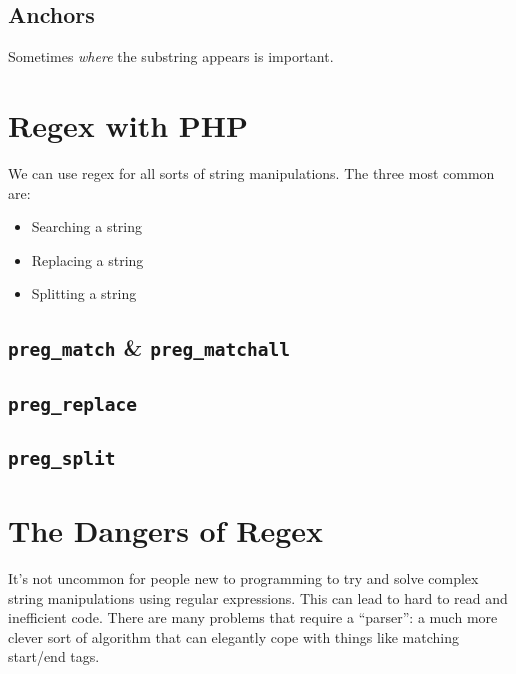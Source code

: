 \subsection{Anchors}

Sometimes \textit{where} the substring appears is important.

\pagebreak


\section{Regex with PHP}

We can use regex for all sorts of string manipulations. The three most common are:

\begin{itemize}
    \item Searching a string
    \item Replacing a string
    \item Splitting a string
\end{itemize}

\subsection{\texttt{preg\_match} \& \texttt{preg\_matchall}}

\subsection{\texttt{preg\_replace}}

\subsection{\texttt{preg\_split}}


\pagebreak


\section{The Dangers of Regex}


It's not uncommon for people new to programming to try and solve complex string manipulations using regular expressions. This can lead to hard to read and inefficient code. There are many problems that require a ``parser'': a much more clever sort of algorithm that can elegantly cope with things like matching start/end tags.
\\

